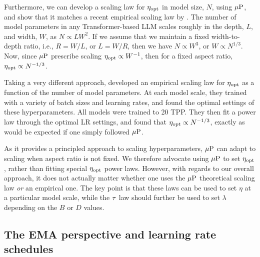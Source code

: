 Furthermore, we can develop a scaling law for $\eta_{\text{opt}}$ in model size,
$N$, using $\mbox{$\mu$P}$, and show that it matches a recent empirical scaling
law by \citet{porian2024resolving}.  The number of model parameters in
any Transformer-based LLM scales roughly in the depth, $L$, and width,
$W$, as $N \propto L W^2$.  If we assume that we maintain a fixed
width-to-depth ratio, i.e., $R = W/L$, or $L = W/R$, then we have $N
\propto W^3$, or $W \propto N^{1/3}$.
%
Now, since $\mbox{$\mu$P}$ prescribe scaling $\eta_{\text{opt}} \propto W^{-1}$, then for
a fixed aspect ratio, $\eta_{\text{opt}} \propto N^{-1/3}$.

Taking a very different approach, \citet{porian2024resolving}
developed an empirical scaling law for $\eta_{\text{opt}}$ as a function of the
number of model parameters.  At each model scale, they trained with a
variety of batch sizes and learning rates, and found the optimal
settings of these hyperparameters.  All models were trained to 20
TPP\@.  They then fit a power law through the optimal LR settings, and
found that $\eta_{\text{opt}} \propto N^{-1/3}$, exactly as would be expected if
one simply followed $\mbox{$\mu$P}$.

As it provides a principled approach to scaling hyperparameters,
$\mbox{$\mu$P}$ can adapt to scaling when aspect ratio is not fixed.  We
therefore advocate using $\mbox{$\mu$P}$ to set $\eta_{\text{opt}}$, rather than fitting
special $\eta_{\text{opt}}$ power laws.
%
However, with regards to our overall approach, it does not actually
matter whether one uses the $\mbox{$\mu$P}$ theoretical scaling law \emph{or}
an empirical one.  The key point is that these laws can be used to set
$\eta$ at a particular model scale, while the $\tau$ law should
further be used to set $\lambda$ depending on the $B$ or $D$ values.


\subsection{The EMA perspective and learning rate schedules}\label{sec:ema_lr}

